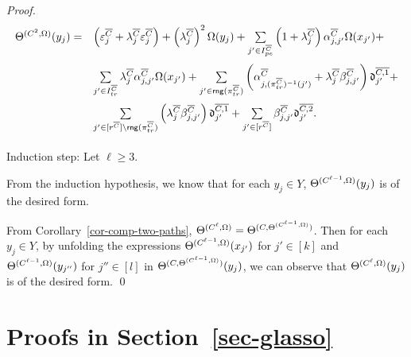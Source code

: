 \begin{appendix}
\begin{proof}
\[
\begin{array}{rl}
	\medskip
	\sumf^{(C^{2},\initval)}(y_j) = & 
	\left(\cste^{\circled{C}}_{j}+
	\cstl^{\circled{C}}_{j} \cste^{\circled{C}}_{j}\right)+ \left(\cstl^{\circled{C}}_{j}\right)^2 \initval(y_j)+ \sum \limits_{j' \in I^{\circled{C}}_{pe}} 
	\left(1+\cstl^{\circled{C}}_{j}\right)  \csta^{\circled{C}}_{j,j'} \initval(x_{j'}) +\\
	\medskip
	& 
	\sum \limits_{j' \in  I^{\circled{C}}_{tr}} 
	 \cstl^{\circled{C}}_{j} \csta^{\circled{C}}_{j,j'}  \initval(x_{j'}) +
	\sum \limits_{j' \in \rng(\pi^{\circled{C}}_{tr})} \left( \csta^{\circled{C}}_{j,(\pi^{\circled{C}}_{tr})^{-1}(j')}+\cstl^{\circled{C}}_{j} \cstb^{\circled{C}}_{j,j'} \right) \vard^{\circled{C,1}}_{j'} + 
	 \\
	\smallskip
	& 
	\sum \limits_{j' \in [r^{\circled{C}}]\setminus \rng(\pi^{\circled{C}}_{tr})} \left( \cstl^{\circled{C}}_{j} \cstb^{\circled{C}}_{j,j'} \right) \vard^{\circled{C,1}}_{j'} +
	
	\sum \limits_{j'\in[r^{\circled{C}}]} \cstb^{\circled{C}}_{j,j'} \vard^{\circled{C,2}}_{j'}.
\end{array}
\]

\noindent Induction step: Let $\ell \ge 3$.

From the induction hypothesis, we know that for each $y_j \in Y$, $\Theta^{(C^{\ell-1},\Omega)}(y_j)$ is of the desired form.

From Corollary~\ref{cor-comp-two-paths}, $\Theta^{(C^\ell,\Omega)} = \Theta^{(C, \Theta^{(C^{\ell-1},\Omega)})}$. Then for each $y_j \in Y$, by unfolding the expressions $\Theta^{(C^{\ell-1},\Omega)}(x_{j'})$ for $j' \in [k]$ and $\Theta^{(C^{\ell-1},\Omega)}(y_{j''})$ for $j'' \in [l]$ in $\Theta^{(C, \Theta^{(C^{\ell-1},\Omega)})}(y_j)$, we can observe that $\Theta^{(C^\ell,\Omega)}(y_j)$ is of the desired form.
\qed
\end{proof}

\section{Proofs in Section~\ref{sec-glasso}}




\end{appendix}
